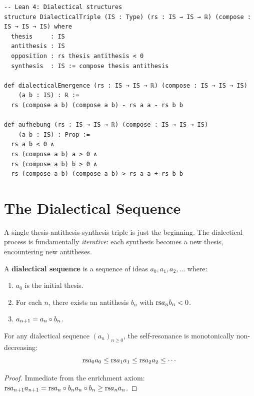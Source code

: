 \begin{lstlisting}
-- Lean 4: Dialectical structures
structure DialecticalTriple (IS : Type) (rs : IS → IS → ℝ) (compose : IS → IS → IS) where
  thesis     : IS
  antithesis : IS
  opposition : rs thesis antithesis < 0
  synthesis  : IS := compose thesis antithesis

def dialecticalEmergence (rs : IS → IS → ℝ) (compose : IS → IS → IS)
    (a b : IS) : ℝ :=
  rs (compose a b) (compose a b) - rs a a - rs b b

def aufhebung (rs : IS → IS → ℝ) (compose : IS → IS → IS)
    (a b : IS) : Prop :=
  rs a b < 0 ∧
  rs (compose a b) a > 0 ∧
  rs (compose a b) b > 0 ∧
  rs (compose a b) (compose a b) > rs a a + rs b b
\end{lstlisting}

\section{The Dialectical Sequence}

A single thesis-antithesis-synthesis triple is just the beginning.  The
dialectical process is fundamentally \emph{iterative}: each synthesis becomes
a new thesis, encountering new antitheses.

\begin{definition}
\label{def:dialectical-sequence}
A \textbf{dialectical sequence} is a sequence of ideas $a_0, a_1, a_2, \ldots$
where:
\begin{enumerate}
\item $a_0$ is the initial thesis.
\item For each $n$, there exists an antithesis $b_n$ with $\mathrm{rs}{a_n}{b_n} < 0$.
\item $a_{n+1} = a_n \circ b_n$.
\end{enumerate}
\end{definition}

\begin{theorem}
\label{thm:dialectical-monotone}
For any dialectical sequence $(a_n)_{n \geq 0}$, the self-resonance is
monotonically non-decreasing:
\[
  \mathrm{rs}{a_0}{a_0} \leq \mathrm{rs}{a_1}{a_1} \leq \mathrm{rs}{a_2}{a_2} \leq \cdots
\]
\end{theorem}

\begin{proof}
Immediate from the enrichment axiom: $\mathrm{rs}{a_{n+1}}{a_{n+1}} = \mathrm{rs}{a_n
\circ b_n}{a_n \circ b_n} \geq \mathrm{rs}{a_n}{a_n}$.
\end{proof}

